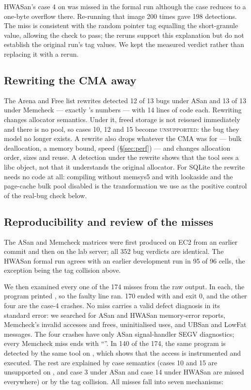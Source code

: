HWASan's case 4 on  was missed in the formal run although the case reduces to a one-byte overflow there. Re-running that image 200 times gave 198 detections. The miss is consistent with the random pointer tag equalling the short-granule value, allowing the check to pass; the reruns support this explanation but do not establish the original run's tag values. We kept the measured verdict rather than replacing it with a rerun.

\subsection{Rewriting the CMA away}
\label{sec:q1-rewrite}

The Arena and Free list rewrites detected 12 of 13 bugs under ASan and 13 of 13 under Memcheck --- exactly 's numbers --- with 14 lines of code each. Rewriting changes allocator semantics. Under it, freed storage is not reissued immediately and there is no pool, so cases 10, 12 and 15 become
\textsc{unsupported}: the bug they model no longer exists. A rewrite also drops whatever the CMA was
for --- bulk deallocation, a memory bound, speed (\S\ref{sec:perf}) --- and changes allocation order, sizes and reuse. A detection under the rewrite shows that the tool sees a libc object, not that it understands the original allocator. For SQLite the rewrite needs no code at all: compiling without memsys5 and with lookaside and the page-cache bulk pool disabled is the transformation we use as the positive control of the real-bug check below.

\subsection{Reproducibility and review of the misses}
\label{sec:audit}

The ASan and Memcheck matrices were first produced on EC2 from an earlier commit and then on the lab server; all 352 bug verdicts are identical. The HWASan formal run agrees with an earlier development run in 95 of 96 cells, the exception being the tag collision above.

We then examined every one of the 174 misses from the raw output. In each, the program printed , so the faulty line ran. 170 ended with  and exit 0, and the other four are the case-4 crashes. No miss carries a valid defect diagnosis in its standard error: we searched for ASan and HWASan memory-error reports, Memcheck's invalid accesses and frees, uninitialised uses, and UBSan and LowFat messages. The four crashes have only ASan signal-handler SEGV diagnostics; every Memcheck miss ends with ``''. In 140 of the 174, the same program is detected by the same tool on , which shows that the access is instrumented and executed. The rest are explained by case semantics (cases 10 and 15 are unsupported on , and case 3 under ASan and case 14 under HWASan are missed everywhere) or by the tag collision. All misses fall into seven mechanisms:

